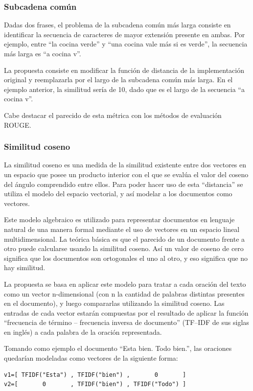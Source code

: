 \documentclass{llncs}
\begin{document}
\subsubsection{Subcadena común}
Dadas dos frases, el problema de la subcadena común más larga consiste en identificar la secuencia de caracteres de mayor extensión presente en ambas. Por ejemplo, entre “la cocina verde” y “una cocina vale más si es verde”, la secuencia más larga es “a cocina v”.

La propuesta consiste en modificar la función de distancia de la implementación original y reemplazarla por el largo de la subcadena común más larga. En el ejemplo anterior, la similitud sería de 10, dado que es el largo de la secuencia “a cocina v”.

Cabe destacar el parecido de esta métrica con los métodos de evaluación ROUGE.


\subsubsection{Similitud coseno}
La similitud coseno es una medida de la similitud existente entre dos vectores en un espacio que posee un producto interior con el que se evalúa el valor del coseno del ángulo comprendido entre ellos. Para poder hacer uso de esta “distancia” se utiliza el modelo del espacio vectorial, y así modelar a los documentos como vectores.

Este modelo algebraico es utilizado para representar documentos en lenguaje natural de una manera formal mediante el uso de vectores en un espacio lineal multidimensional. La teórica básica es que el parecido de un documento frente a otro puede calcularse usando la similitud coseno. Así un valor de coseno de cero significa que los documentos son ortogonales el uno al otro, y eso significa que no hay similitud.

La propuesta se basa en aplicar este modelo para tratar a cada oración del texto como un vector n-dimensional (con n la cantidad de palabras distintas presentes en el documento), y luego compararlas utilizando la similitud coseno. Las entradas de cada vector estarán compuestas por el resultado de aplicar la función “frecuencia de término -- frecuencia inversa de documento” (TF--IDF de sus siglas en inglés) a cada palabra de la oración representada.

Tomando como ejemplo el documento “Esta bien. Todo bien.”, las oraciones quedarían modeladas como vectores de la siguiente forma:

\begin{Verbatim}[xleftmargin=3em]
v1=[ TFIDF("Esta") , TFIDF("bien") ,       0       ]
v2=[       0       , TFIDF("bien") , TFIDF("Todo") ]
\end{Verbatim}
\end{document}

